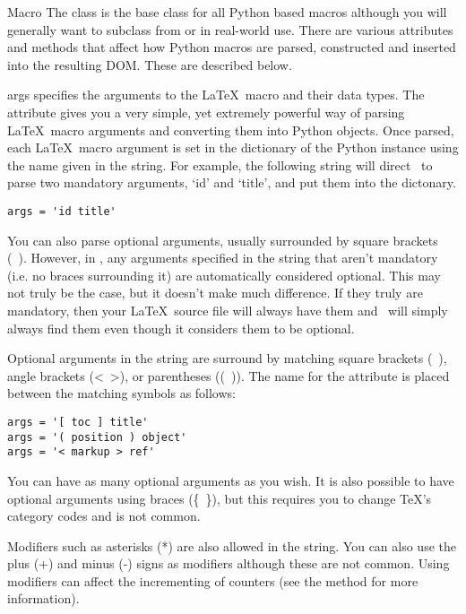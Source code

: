 \begin{classdesc}{Macro}{}
The  class is the base class for all Python based macros
although you will generally want to subclass from  or 
 in real-world use.  There are various attributes and
methods that affect how Python macros are parsed, constructed and 
inserted into the resulting DOM.  These are described below.
\end{classdesc}

\begin{memberdesc}[Macro]{args}
specifies the arguments to the \LaTeX\ macro and their data types.  The
 attribute gives you a very simple, yet extremely powerful way
of parsing \LaTeX\ macro arguments and converting them into Python objects.
Once parsed, each \LaTeX\ macro argument is set in the 
dictionary of the Python instance using the name given in the 
string.  For example, the following  string will direct 
\plasTeX\ to parse two mandatory arguments, `id' and `title', and put them 
into the  dictonary.
\begin{verbatim}
args = 'id title'
\end{verbatim}

You can also parse optional arguments, usually surrounded by square brackets
(\lbrack~\rbrack).  However, in \plasTeX, any arguments specified in the 
string that aren't mandatory (i.e. no braces surrounding it) are automatically
considered optional.  This may not truly be the case, but it doesn't make
much difference.  If they truly are mandatory, then your \LaTeX\ source file will
always have them and \plasTeX\ will simply always find them even though it
considers them to be optional.  

Optional arguments in the  string are surround by matching
square brackets (\lbrack~\rbrack), angle brackets (<~>), or parentheses ((~)).
The name for the attribute is placed between the matching symbols as follows:
\begin{verbatim}
args = '[ toc ] title'
args = '( position ) object'
args = '< markup > ref'
\end{verbatim}
You can have as many optional arguments as you wish.  It is also possible to 
have optional arguments using braces (\{~\}), but this requires you
to change \TeX's category codes and is not common.

Modifiers such as asterisks (*) are also allowed in the  string.
You can also use the plus (+) and minus (-) signs as modifiers although these
are not common.  Using modifiers can affect the incrementing of counters (see
the  method for more information).


\end{memberdesc}
